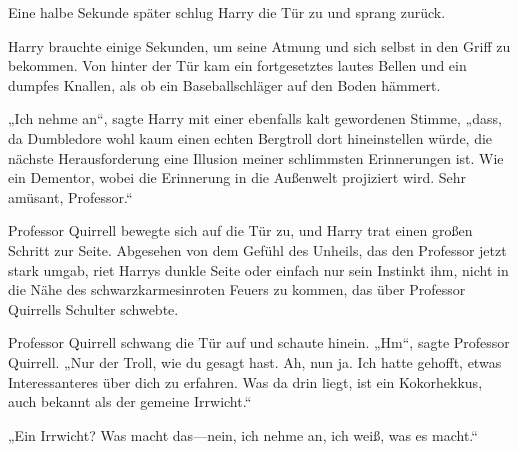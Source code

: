 \later

Eine halbe Sekunde später schlug Harry die Tür zu und sprang zurück.

Harry brauchte einige Sekunden, um seine Atmung und sich selbst in den Griff zu bekommen. Von hinter der Tür kam ein fortgesetztes lautes Bellen und ein dumpfes Knallen, als ob ein Baseballschläger auf den Boden hämmert.

„Ich nehme an“, sagte Harry mit einer ebenfalls kalt gewordenen Stimme, „dass, da Dumbledore wohl kaum einen echten Bergtroll dort hineinstellen würde, die nächste Herausforderung eine Illusion meiner schlimmsten Erinnerungen ist. Wie ein Dementor, wobei die Erinnerung in die Außenwelt projiziert wird. Sehr amüsant, Professor.“

Professor Quirrell bewegte sich auf die Tür zu, und Harry trat einen großen Schritt zur Seite. Abgesehen von dem Gefühl des Unheils, das den Professor jetzt stark umgab, riet Harrys dunkle Seite oder einfach nur sein Instinkt ihm, nicht in die Nähe des schwarzkarmesinroten Feuers zu kommen, das über Professor Quirrells Schulter schwebte.

Professor Quirrell schwang die Tür auf und schaute hinein.
„Hm“, sagte Professor Quirrell. „Nur der Troll, wie du gesagt hast. Ah, nun ja. Ich hatte gehofft, etwas Interessanteres über dich zu erfahren. Was da drin liegt, ist ein Kokorhekkus, auch bekannt als der gemeine Irrwicht.“

„Ein Irrwicht? Was macht das—nein, ich nehme an, ich weiß, was es macht.“

